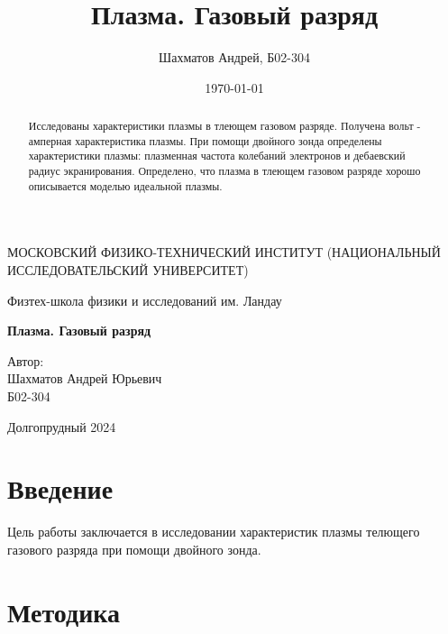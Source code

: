 \documentclass[12pt]{article}
\title{Плазма. Газовый разряд}
\author{Шахматов Андрей, Б02-304}
\date{\today}
\begin{document}
\begin{titlepage}
	\begin{center}
		{\large МОСКОВСКИЙ ФИЗИКО-ТЕХНИЧЕСКИЙ ИНСТИТУТ (НАЦИОНАЛЬНЫЙ ИССЛЕДОВАТЕЛЬСКИЙ УНИВЕРСИТЕТ)}
	\end{center}
	\begin{center}
		{\large Физтех-школа физики и исследований им. Ландау}
	\end{center}

	\vspace{3cm}
	{\huge
		\begin{center}
			\textbf{Плазма. Газовый разряд}
		\end{center}
	}
	\vspace{2cm}
	\begin{flushright}
		{\LARGE Автор:\\ Шахматов Андрей Юрьевич \\
			\vspace{0.2cm}
			Б02-304}
	\end{flushright}
	\vspace{7 cm}
	\begin{center}
		Долгопрудный 2024
	\end{center}
	\thispagestyle{empty}
\end{titlepage}


\begin{abstract}
	Исследованы характеристики плазмы в тлеющем газовом разряде. Получена вольт - амперная
	характеристика плазмы. При помощи двойного зонда определены характеристики плазмы:
	плазменная частота колебаний электронов и дебаевский радиус экранирования. Определено,
	что плазма в тлеющем газовом разряде хорошо описывается моделью идеальной плазмы.
\end{abstract}


\section*{Введение}
Цель работы заключается в исследовании характеристик плазмы телющего газового разряда при помощи двойного зонда.

\section*{Методика}
\end{document}
